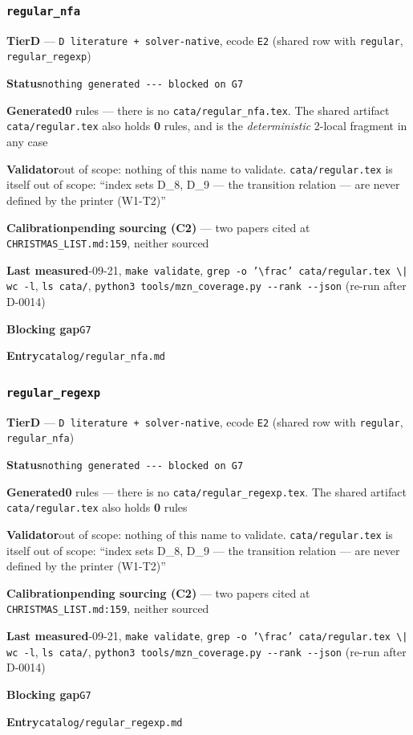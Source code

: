 \documentclass[10pt,a4paper]{article}
\newcommand{\entryfield}[2]{{\raggedright\textbf{#1}\quad #2\par}}
\begin{document}
\subsubsection*{\texttt{regular\_\allowbreak{}nfa}}
\label{entry:regular-nfa}
\entryfield{Tier}{\textbf{D} --- \texttt{D literature + solver-\allowbreak{}native}, ecode \texttt{E2} (shared row with \texttt{regular}, \texttt{regular\_regexp})}
\entryfield{Status}{\texttt{nothing generated -\allowbreak{}-\allowbreak{}-\allowbreak{} blocked on G7}}
\entryfield{Generated}{\textbf{0} rules --- there is no \texttt{cata/regular\_nfa.tex}. The shared artifact \texttt{cata/regular.tex} also holds \textbf{0} rules, and is the \emph{deterministic} 2-local fragment in any case}
\entryfield{Validator}{out of scope: nothing of this name to validate. \texttt{cata/regular.tex} is itself out of scope: ``index sets D\_8, D\_9 --- the transition relation --- are never defined by the printer (W1-T2)''}
\entryfield{Calibration}{\textbf{pending sourcing (C2)} --- two papers cited at \texttt{CHRISTMAS\_LIST.md:159}, neither sourced}
\entryfield{Last measured}{2026-09-21, \texttt{make validate}, \texttt{grep -\allowbreak{}o '\textbackslash{}frac' cata/\allowbreak{}regular.\allowbreak{}tex \textbackslash{}| wc -\allowbreak{}l}, \texttt{ls cata/}, \texttt{python3 tools/\allowbreak{}mzn\_\allowbreak{}coverage.\allowbreak{}py -\allowbreak{}-\allowbreak{}rank -\allowbreak{}-\allowbreak{}json} (re-run after D-0014)}
\entryfield{Blocking gap}{\texttt{G7}}
\entryfield{Entry}{\texttt{catalog/regular\_nfa.md}}
\subsubsection*{\texttt{regular\_\allowbreak{}regexp}}
\label{entry:regular-regexp}
\entryfield{Tier}{\textbf{D} --- \texttt{D literature + solver-\allowbreak{}native}, ecode \texttt{E2} (shared row with \texttt{regular}, \texttt{regular\_nfa})}
\entryfield{Status}{\texttt{nothing generated -\allowbreak{}-\allowbreak{}-\allowbreak{} blocked on G7}}
\entryfield{Generated}{\textbf{0} rules --- there is no \texttt{cata/regular\_regexp.tex}. The shared artifact \texttt{cata/regular.tex} also holds \textbf{0} rules}
\entryfield{Validator}{out of scope: nothing of this name to validate. \texttt{cata/regular.tex} is itself out of scope: ``index sets D\_8, D\_9 --- the transition relation --- are never defined by the printer (W1-T2)''}
\entryfield{Calibration}{\textbf{pending sourcing (C2)} --- two papers cited at \texttt{CHRISTMAS\_LIST.md:159}, neither sourced}
\entryfield{Last measured}{2026-09-21, \texttt{make validate}, \texttt{grep -\allowbreak{}o '\textbackslash{}frac' cata/\allowbreak{}regular.\allowbreak{}tex \textbackslash{}| wc -\allowbreak{}l}, \texttt{ls cata/}, \texttt{python3 tools/\allowbreak{}mzn\_\allowbreak{}coverage.\allowbreak{}py -\allowbreak{}-\allowbreak{}rank -\allowbreak{}-\allowbreak{}json} (re-run after D-0014)}
\entryfield{Blocking gap}{\texttt{G7}}
\entryfield{Entry}{\texttt{catalog/regular\_regexp.md}}
\end{document}
